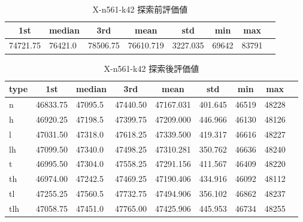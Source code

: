 \begin{table}[htbp]
    \centering
    \caption{X-n561-k42 探索前評価値}
    \begin{tabular}{|l|l|l|l|l|l|l|l|}\hline
    \multicolumn{1}{|c|}{\textbf{1st}}
    &\multicolumn{1}{c|}{\textbf{median}}
    &\multicolumn{1}{c|}{\textbf{3rd}}
    &\multicolumn{1}{c|}{\textbf{mean}}
    &\multicolumn{1}{c|}{\textbf{std}}
    &\multicolumn{1}{c|}{\textbf{min}}
    &\multicolumn{1}{c|}{\textbf{max}}\\\hline
	74721.75 & 76421.0 & 78506.75 & 76610.719 & 3227.035 & 69642 & 83791\\\hline
	\end{tabular}
\end{table}
\begin{table}[htbp]
    \centering
    \caption{X-n561-k42 探索後評価値}
    \begin{tabular}{|l|l|l|l|l|l|l|l|l|}\hline
    \multicolumn{1}{|c|}{\textbf{type}}
    &\multicolumn{1}{|c|}{\textbf{1st}}
    &\multicolumn{1}{c|}{\textbf{median}}
    &\multicolumn{1}{c|}{\textbf{3rd}}
    &\multicolumn{1}{c|}{\textbf{mean}}
    &\multicolumn{1}{c|}{\textbf{std}}
    &\multicolumn{1}{c|}{\textbf{min}}
    &\multicolumn{1}{c|}{\textbf{max}}\\\hline
	n & 46833.75 & 47095.5 & 47440.50 & 47167.031 & 401.645 & 46519 & 48228\\\hline
	h & 46920.25 & 47198.5 & 47399.75 & 47209.000 & 446.966 & 46130 & 48126\\\hline
	l & 47031.50 & 47318.0 & 47618.25 & 47339.500 & 419.317 & 46616 & 48227\\\hline
	lh & 47099.50 & 47340.0 & 47498.25 & 47310.281 & 350.762 & 46636 & 48240\\\hline
	t & 46995.50 & 47304.0 & 47558.25 & 47291.156 & 411.567 & 46409 & 48220\\\hline
	th & 46974.00 & 47242.5 & 47469.25 & 47190.406 & 434.916 & 46092 & 48112\\\hline
	tl & 47255.25 & 47560.5 & 47732.75 & 47494.906 & 356.102 & 46862 & 48237\\\hline
	tlh & 47058.75 & 47451.0 & 47765.00 & 47425.906 & 445.953 & 46734 & 48255\\\hline
	\end{tabular}
\end{table}
